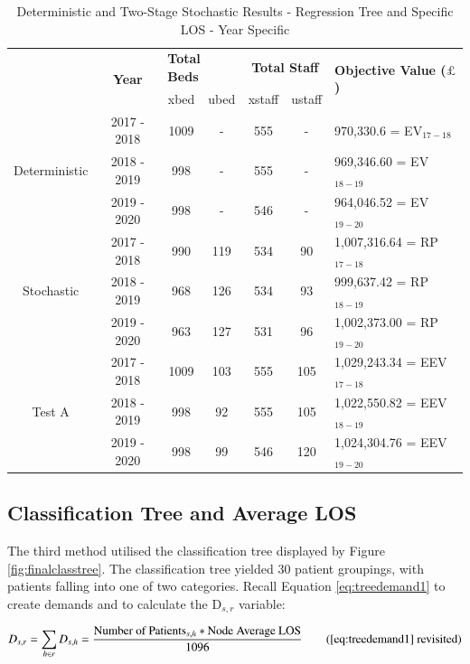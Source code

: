 \documentclass[../thesis.tex]{subfiles}
\begin{document}
\begin{table}[h!]
    \centering
    \begin{tabular}{ccccccl}\toprule
 & \multirow{2}{*}{\textbf{Year}}& \multicolumn{2}{l}{\textbf{Total Beds}} & \multicolumn{2}{c}{\textbf{Total Staff}} & \multirow{2}{*}{\textbf{Objective Value ($\pounds$)}}\\ \cmidrule(lr){3-4} \cmidrule(lr){5-6}
&& xbed           & ubed          & xstaff         & ustaff         \\ \midrule
     \multirow{3}{*}{Deterministic} & 2017 - 2018 & 1009 & - & 555 & - & 970,330.6
=  EV$_{17-18}$ \\ 
      & 2018 - 2019 & 998 & - & 555 & - & 969,346.60 =  EV$_{18-19}$ \\
      & 2019 - 2020 &  998 & - & 546 & -& 964,046.52 = EV$_{19-20}$\\\midrule
     \multirow{3}{*}{Stochastic} & 2017 - 2018 & 990 & 119 & 534 & 90 & 1,007,316.64 =  RP$_{17-18}$ \\ 
      & 2018 - 2019 & 968 & 126 & 534 & 93 &999,637.42 =  RP$_{18-19}$ \\
      & 2019 - 2020 & 963  & 127  & 531 & 96 & 1,002,373.00 =  RP$_{19-20}$\\ \midrule
      \multirow{3}{*}{Test A}& 2017 - 2018 & 1009 & 103 & 555 & 105 & 1,029,243.34 = EEV$_{17-18}$\\
      & 2018 - 2019 &998& 92&555&105&1,022,550.82 = EEV$_{18-19}$\\
      & 2019 - 2020 & 998 & 99 & 546 & 120 &1,024,304.76  = EEV$_{19-20}$\\\bottomrule      
    \end{tabular}
    \caption{Deterministic and Two-Stage Stochastic Results - Regression Tree and Specific LOS - Year Specific}
    \label{tab:Results5}
\end{table}

\subsection{Classification Tree and Average LOS}
The third method utilised the classification tree displayed by Figure \ref{fig:finalclasstree}. The classification tree yielded 30 patient groupings, with patients falling into one of two categories. Recall Equation \eqref{eq:treedemand1} to create demands and to calculate the D$_{s,r}$ variable:

\begin{equation}
        D_{s,r} = \sum\limits_{h \in r} D_{s,h} = \frac{\text{Number of Patients}_{s,h}*\text{Node Average LOS}}{1096} \tag{\ref{eq:treedemand1} revisited}\\
\end{equation}
\end{document}
